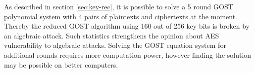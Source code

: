 As described in section \ref{sec:key-rec}, it is possible to solve a 5 round
GOST polynomial system with 4 pairs of plaintexts and ciphertexts at the
moment. Thereby the reduced GOST algorithm using 160 out of 256 key bits is
broken by an algebraic attack. Such statistics strengthens the opinion about
AES vulnerability to algebraic attacks. Solving the GOST equation system for
additional rounds requires more computation power, however finding the solution
may be possible on better computers. 


